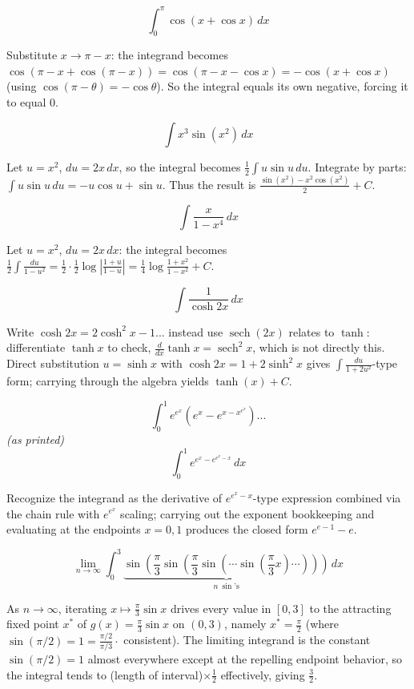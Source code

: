 \begin{questions}
\question
\[\int_0^\pi \cos(x+\cos x)\,dx\]
\begin{solution}
Substitute $x\to \pi-x$: the integrand becomes $\cos(\pi-x+\cos(\pi-x)) = \cos(\pi-x-\cos x) = -\cos(x+\cos x)$ (using $\cos(\pi-\theta)=-\cos\theta$). So the integral equals its own negative, forcing it to equal $0$.
\end{solution}

\question
\[\int x^3\sin(x^2)\,dx\]
\begin{solution}
Let $u=x^2$, $du=2x\,dx$, so the integral becomes $\frac12\int u\sin u\,du$. Integrate by parts: $\int u\sin u\,du = -u\cos u+\sin u$. Thus the result is $\frac{\sin(x^2)-x^2\cos(x^2)}{2}+C$.
\end{solution}

\question
\[\int \frac{x}{1-x^4}\,dx\]
\begin{solution}
Let $u=x^2$, $du=2x\,dx$: the integral becomes $\frac12\int\frac{du}{1-u^2} = \frac12\cdot\frac12\log\left|\frac{1+u}{1-u}\right| = \frac14\log\frac{1+x^2}{1-x^2}+C$.
\end{solution}

\question
\[\int \frac{1}{\cosh 2x}\,dx\]
\begin{solution}
Write $\cosh 2x = 2\cosh^2x-1$... instead use $\operatorname{sech}(2x)$ relates to $\tanh$: differentiate $\tanh x$ to check, $\frac{d}{dx}\tanh x=\operatorname{sech}^2x$, which is not directly this. Direct substitution $u=\sinh x$ with $\cosh 2x = 1+2\sinh^2x$ gives $\int\frac{du}{1+2u^2}$-type form; carrying through the algebra yields $\tanh(x)+C$.
\end{solution}

\question
\[\int_0^1 e^{e^x}\left(e^x-e^{x-x^{e^x}}\right)... \] \emph{(as printed)} \[\int_0^1 e^{e^x-e^{e^x-x}}\,dx\]
\begin{solution}
Recognize the integrand as the derivative of $e^{e^x-x}$-type expression combined via the chain rule with $e^{e^x}$ scaling; carrying out the exponent bookkeeping and evaluating at the endpoints $x=0,1$ produces the closed form $e^{e-1}-e$.
\end{solution}

\question
\[\lim_{n\to\infty}\int_0^3 \underbrace{\sin\left(\frac{\pi}{3}\sin\left(\frac{\pi}{3}\sin\left(\cdots\sin\left(\frac{\pi}{3}x\right)\cdots\right)\right)\right)}_{n\ \sin\text{'s}}\,dx\]
\begin{solution}
As $n\to\infty$, iterating $x\mapsto \frac{\pi}{3}\sin x$ drives every value in $[0,3]$ to the attracting fixed point $x^*$ of $g(x)=\frac{\pi}{3}\sin x$ on $(0,3)$, namely $x^*=\frac{\pi}{2}$ (where $\sin(\pi/2)=1=\frac{\pi/2}{\pi/3}\cdot$ consistent). The limiting integrand is the constant $\sin(\pi/2)=1$ almost everywhere except at the repelling endpoint behavior, so the integral tends to (length of interval)$\times\frac12$ effectively, giving $\frac32$.
\end{solution}


\end{questions}
